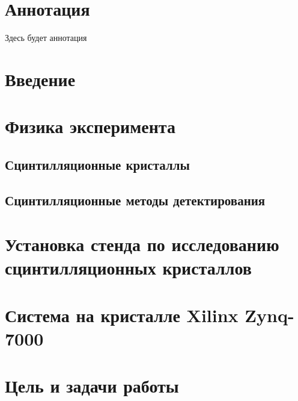 \documentclass[a4paper, 14pt]{extarticle}
\begin{document}

\section*{Аннотация}
Здесь будет аннотация
\newpage

\tableofcontents
\newpage

\section*{Введение}
    
    \newpage

\section{Физика эксперимента}
    
    \subsection{Сцинтилляционные кристаллы}
    
    \subsection{Сцинтилляционные методы детектирования}
    
    \newpage

\section{Установка стенда по исследованию сцинтилляционных кристаллов}
    
%    
    \newpage

\section{Система на кристалле Xilinx Zynq-7000}
    
    \newpage
    
\section{Цель и задачи работы}
    
    \newpage
    
\end{document}
